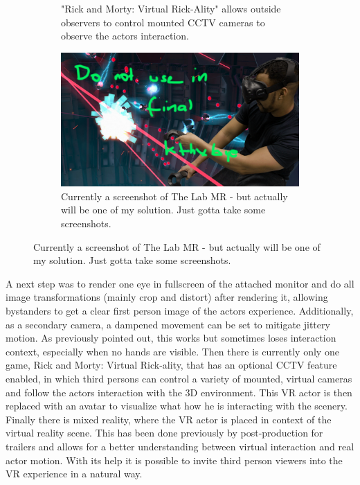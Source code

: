 \begin{figure}[htbp]
\begin{subfigure}[t]{.45\textwidth}
		\caption{"Rick and Morty: Virtual Rick-Ality" allows outside observers 
			to control mounted CCTV cameras to observe the actors interaction.}
	\end{subfigure}
	\begin{subfigure}[t]{.45\textwidth}
		\centering
		\includegraphics[width=\textwidth]{_raw_resources/the_lab_mr.png}
		\caption{Currently a screenshot of The Lab MR - but actually will be 
			one of my solution. Just gotta take some screenshots.}
	\end{subfigure}
\end{figure}

A next step was to render one eye in fullscreen of the attached monitor and do 
all image transformations (mainly crop and distort) after rendering it, 
allowing bystanders to get a clear first person image of the actors experience. 
Additionally, as a secondary camera, a dampened movement can be set to mitigate 
jittery motion. As previously pointed out, this works but sometimes loses 
interaction context, especially when no hands are visible. 
\newline
Then there is currently only one game, Rick and Morty: Virtual Rick-ality, that 
has an optional CCTV feature enabled, in which third persons can control a 
variety of mounted, virtual cameras and follow the actors interaction with the 
3D environment. This VR actor is then replaced with an avatar to visualize what 
how he is interacting with the scenery.
\newline
Finally there is mixed reality, where the VR actor is placed in context of 
the virtual reality scene. This has been done previously by post-production for 
trailers and allows for a better understanding between virtual interaction and 
real actor motion. With its help it is possible to invite third person viewers 
into the VR experience in a natural way.

